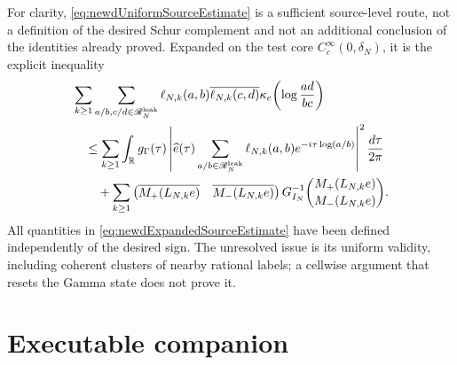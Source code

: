 \documentclass[11pt]{amsart}
\theoremstyle{definition}
\theoremstyle{remark}
\newcommand{\R}{\mathbb R}
\begin{document}
For clarity, \eqref{eq:newdUniformSourceEstimate} is a sufficient
source-level route, not a definition of the desired Schur complement and not
an additional conclusion of the identities already proved.  Expanded on the
test core $C_c^\infty(0,\delta_N)$, it is the explicit inequality
\begin{align}
 &\sum_{k\geq1}
 \sum_{a/b,c/d\in\mathscr R_N^{\rm leak}}
 \ell_{N,k}(a,b)\overline{\ell_{N,k}(c,d)}
 \kappa_e\!\left(\log\frac{ad}{bc}\right)
 \notag\\
 &\quad\leq
 \sum_{k\geq1}\int_\R g_\Gamma(\tau)
 \left|\widehat e(\tau)
   \sum_{a/b\in\mathscr R_N^{\rm leak}}
       \ell_{N,k}(a,b)e^{-i\tau\log(a/b)}\right|^2
 \frac{d\tau}{2\pi}
 \notag\\
 &\qquad+
 \sum_{k\geq1}
 \begin{pmatrix}
  \overline{M_+(L_{N,k}e)}&\overline{M_-(L_{N,k}e)}
 \end{pmatrix}
 G_{I_N}^{-1}
 \binom{M_+(L_{N,k}e)}{M_-(L_{N,k}e)}.
 \label{eq:newdExpandedSourceEstimate}
\end{align}
All quantities in \eqref{eq:newdExpandedSourceEstimate} have been defined
independently of the desired sign.  The unresolved issue is its uniform
validity, including coherent clusters of nearby rational labels; a cellwise
argument that resets the Gamma state does not prove it.

\begin{center}
\end{center}


\section*{Executable companion}
\end{document}
